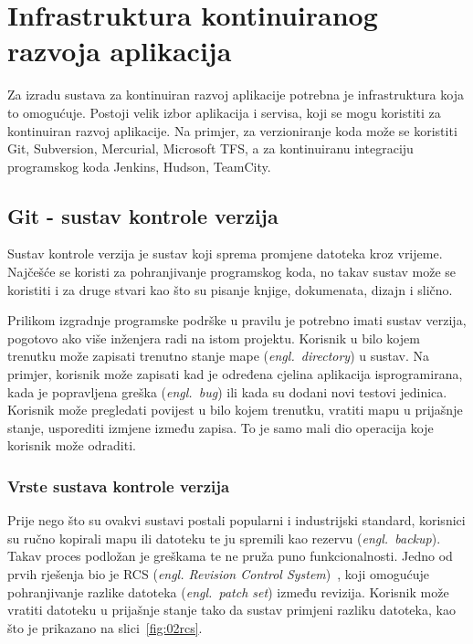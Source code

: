 \chapter{Infrastruktura kontinuiranog razvoja aplikacija}
Za izradu sustava za kontinuiran razvoj aplikacije potrebna je infrastruktura koja to omogućuje.
Postoji velik izbor aplikacija i servisa, koji se mogu koristiti za kontinuiran razvoj aplikacije.
Na primjer, za verzioniranje koda može se koristiti Git, Subversion, Mercurial, Microsoft TFS, a za
kontinuiranu integraciju programskog koda Jenkins, Hudson, TeamCity.

\section{Git - sustav kontrole verzija}
Sustav kontrole verzija je sustav koji sprema promjene datoteka kroz vrijeme. Najčešće se koristi za
pohranjivanje programskog koda, no takav sustav može se koristiti i za druge stvari kao što su
pisanje knjige, dokumenata, dizajn i slično.

Prilikom izgradnje programske podrške u pravilu je potrebno imati sustav verzija, pogotovo ako više
inženjera radi na istom projektu. Korisnik u bilo kojem trenutku može zapisati trenutno stanje mape
(\textit{engl.~directory}) u sustav. Na primjer, korisnik može zapisati kad je određena cjelina
aplikacija isprogramirana, kada je popravljena greška (\textit{engl.~bug}) ili kada su dodani novi
testovi jedinica. Korisnik može pregledati povijest u bilo kojem trenutku, vratiti mapu u prijašnje
stanje, usporediti izmjene između zapisa. To je samo mali dio operacija koje korisnik može odraditi.

\subsection{Vrste sustava kontrole verzija}
Prije nego što su ovakvi sustavi postali popularni i industrijski standard, korisnici su ručno
kopirali mapu ili datoteku te ju spremili kao rezervu (\textit{engl.~backup}). Takav proces podložan
je greškama te ne pruža puno funkcionalnosti. Jedno od prvih rješenja bio je RCS (\textit{engl.
Revision Control System})~\citep{chacon2014pro}, koji omogućuje pohranjivanje razlike datoteka
(\textit{engl.~patch set}) između revizija. Korisnik može vratiti datoteku u prijašnje stanje tako
da sustav primjeni razliku datoteka, kao što je prikazano na slici~\ref{fig:02rcs}.

